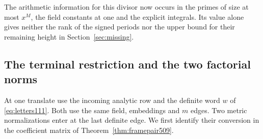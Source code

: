 \documentclass[a4paper,11pt]{article}
\theoremstyle{definition}
\theoremstyle{remark}
\numberwithin{equation}{section}
\begin{document}
The arithmetic information for this divisor now occurs in the
primes of size at most \(x^M\), the field constants at one and
the explicit integrals. Its value alone gives neither the rank
of the signed periods nor the upper bound for their remaining
height in Section~\ref{sec:missing}.


\subsection{The terminal restriction and the two factorial norms}
\label{sec:twofactorials512}

At one translate use the incoming analytic row and the definite
word \(w\) of \eqref{eq:letters111}. Both use the same field,
embeddings and \(m\) edges. Two metric normalizations enter at the
last definite edge. We first identify their conversion in the
coefficient matrix of Theorem~\ref{thm:framepair509}.
\end{document}
